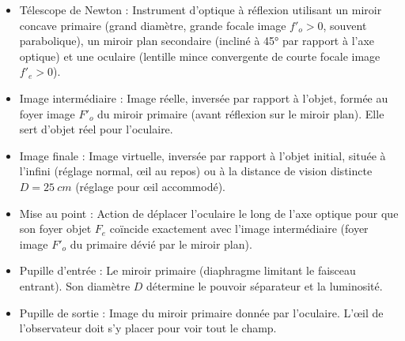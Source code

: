 \documentclass[11pt]{article}
\newcommand{\cle}[1]{{\popxbold\color{popdark}#1}}
\newcounter{popsec}
\newcounter{popsub}
\newcommand{\courssub}[1]{%
  \stepcounter{popsub}%
  \par\vspace{9pt}\noindent{\popxbold\fontsize{11.5}{13}\selectfont\color{popink}{\color{poporange}\thepopsec.\thepopsub}\hspace{6pt}#1}\par\nopagebreak\vspace{4pt}
}
\begin{document}
\courssub{Définitions clés}
\begin{definition}
\begin{itemize}
  \item \cle{Télescope de Newton} : Instrument d'optique à réflexion utilisant un \cle{miroir concave primaire} (grand diamètre, grande focale image $f'_o > 0$, souvent parabolique), un \cle{miroir plan secondaire} (incliné à 45° par rapport à l'axe optique) et une \cle{oculaire} (lentille mince convergente de courte focale image $f'_e > 0$).
  \item \cle{Image intermédiaire} : Image réelle, inversée par rapport à l'objet, formée au foyer image $F'_o$ du miroir primaire (avant réflexion sur le miroir plan). Elle sert d'objet réel pour l'oculaire.
  \item \cle{Image finale} : Image virtuelle, inversée par rapport à l'objet initial, située à l'infini (réglage normal, œil au repos) ou à la distance de vision distincte $D = \SI{25}{cm}$ (réglage pour œil accommodé).
  \item \cle{Mise au point} : Action de déplacer l'oculaire le long de l'axe optique pour que son foyer objet $F_e$ coïncide exactement avec l'image intermédiaire (foyer image $F'_o$ du primaire dévié par le miroir plan).
  \item \cle{Pupille d'entrée} : Le miroir primaire (diaphragme limitant le faisceau entrant). Son diamètre $D$ détermine le pouvoir séparateur et la luminosité.
  \item \cle{Pupille de sortie} : Image du miroir primaire donnée par l'oculaire. L'œil de l'observateur doit s'y placer pour voir tout le champ.
\end{itemize}
\end{definition}
\end{document}
